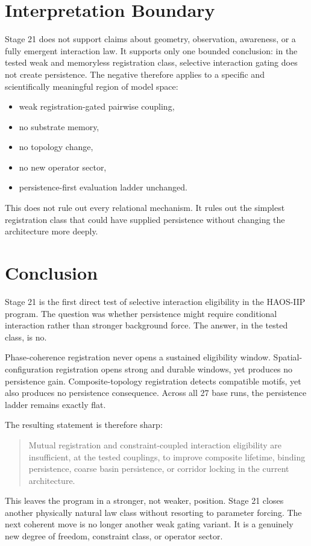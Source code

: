 \documentclass[11pt]{article}
\begin{document}
\section{Interpretation Boundary}

Stage 21 does not support claims about geometry, observation, awareness, or a fully emergent interaction law. It supports only one bounded conclusion: in the tested weak and memoryless registration class, selective interaction gating does not create persistence. The negative therefore applies to a specific and scientifically meaningful region of model space:
\begin{itemize}
\item weak registration-gated pairwise coupling,
\item no substrate memory,
\item no topology change,
\item no new operator sector,
\item persistence-first evaluation ladder unchanged.
\end{itemize}

This does not rule out every relational mechanism. It rules out the simplest registration class that could have supplied persistence without changing the architecture more deeply.

\section{Conclusion}

Stage 21 is the first direct test of selective interaction eligibility in the HAOS-IIP program. The question was whether persistence might require conditional interaction rather than stronger background force. The answer, in the tested class, is no.

Phase-coherence registration never opens a sustained eligibility window. Spatial-configuration registration opens strong and durable windows, yet produces no persistence gain. Composite-topology registration detects compatible motifs, yet also produces no persistence consequence. Across all 27 base runs, the persistence ladder remains exactly flat.

The resulting statement is therefore sharp:

\begin{quote}
Mutual registration and constraint-coupled interaction eligibility are insufficient, at the tested couplings, to improve composite lifetime, binding persistence, coarse basin persistence, or corridor locking in the current architecture.
\end{quote}

This leaves the program in a stronger, not weaker, position. Stage 21 closes another physically natural law class without resorting to parameter forcing. The next coherent move is no longer another weak gating variant. It is a genuinely new degree of freedom, constraint class, or operator sector.
\end{document}
